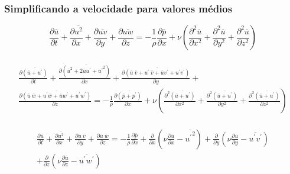 \documentclass[xcolor=dvipsnames,10pt,aspectratio=169]{beamer}
\begin{document}
		
				\begin{frame}
		\frametitle{Simplificando a velocidade para valores médios}
		\begin{equation}
		\frac{\partial \overline{u}}{\partial t} + \frac{\partial \overline{u^2}}{\partial x} + \frac{\partial \overline{uv}}{\partial y} + \frac{\partial \overline{uw}}{\partial z} = - \frac{1}{\rho}  \frac{\partial \overline{p}}{\partial x} + \nu  \left( \frac{\partial^2 \overline{u}}{\partial {x^2}} + \frac{\partial^2 \overline{u}}{\partial y^2} + \frac{\partial^2 \overline{u}}{\partial z^2}   \right)
		\end{equation}
		\\
		\begin{equation}
		\begin{split}
		\frac{\partial \overline{(\overline{u} + u^\prime)}}{\partial t} + \frac{\partial \overline{(\overline{u}^2 + 2  \overline{u}  u^\prime + {u^\prime}^2)}}{\partial x} + \frac{\partial \overline{(\overline{u}\ \overline{v} + u^\prime  \  \overline{v} + \overline{u}  v^\prime + u^\prime  v ^\prime )}}{\partial y} + \\
		\frac{\partial \overline{(\overline{u} \ \overline{w} + u^\prime  \overline{w} + \overline{u}  w^\prime + u^\prime  w ^\prime )}}{\partial z} = - \frac{1}{\rho}  \frac{\partial \overline{(\overline{p} + p ^\prime)}}{\partial x} + \nu  \left( \frac{\partial^2 \overline{(\overline{u} + u^\prime)}}{\partial {x^2}} + \frac{\partial^2 \overline{(\overline{u} + u^\prime)}}{\partial y^2} + \frac{\partial^2 \overline{(\overline{u} + u^\prime)}}{\partial z^2}   \right)
		\end{split}
		\end{equation}
		\\
		\begin{equation}
		\begin{split}
		\frac{\partial \overline{u}}{\partial t} + \frac{\partial \overline{u^2}}{\partial x} + \frac{\partial \overline{u} \ \overline{v}}{\partial y} + \frac{\partial \overline{u} \ \overline{w}}{\partial z} =  - \frac{1}{\rho}  \frac{\partial \overline{{p}}}{\partial x} + \frac{\partial}{\partial x} \left( \nu \frac{\partial \overline{u}}{\partial x} - \overline{{u^\prime}^2}\right) + \frac{\partial}{\partial y} \left( \nu \frac{\partial \overline{u}}{\partial y} - \overline{{u^\prime v^\prime}}\right) \\
		+ \frac{\partial}{\partial z} \left( \nu  \frac{\partial \overline{u}}{\partial z} - \overline{ u ^\prime w ^\prime} \right)
		\end{split}
		\end{equation}
		\end{frame}
		
\end{document}
